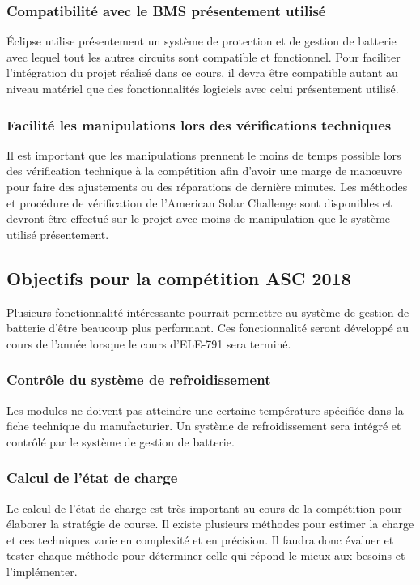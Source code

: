 		\subsubsection{Compatibilité avec le BMS présentement utilisé}
		Éclipse utilise présentement un système de protection et de gestion de batterie avec lequel tout les autres circuits sont compatible et fonctionnel. Pour faciliter l'intégration du projet réalisé dans ce cours, il devra être compatible autant au niveau matériel que des fonctionnalités logiciels avec celui présentement utilisé.		
		
		\subsubsection{Facilité les manipulations lors des vérifications techniques}
		Il est important que les manipulations prennent le moins de temps possible lors des vérification technique à la compétition afin d'avoir une marge de manœuvre pour faire des ajustements ou des réparations de dernière minutes. Les méthodes et procédure de vérification de l'American Solar Challenge sont disponibles et devront être effectué sur le projet avec moins de manipulation que le système utilisé présentement.
		
	\subsection{Objectifs pour la compétition ASC 2018}
	Plusieurs fonctionnalité intéressante pourrait permettre au système de gestion de batterie d'être beaucoup plus performant. Ces fonctionnalité seront développé au cours de l'année lorsque le cours d'ELE-791 sera terminé. 
	
	\subsubsection{Contrôle du système de refroidissement}
	Les modules ne doivent pas atteindre une certaine température spécifiée dans la fiche technique du manufacturier. Un système de refroidissement sera intégré et contrôlé par le système de gestion de batterie. 
	
	\subsubsection{Calcul de l'état de charge}
	Le calcul de l'état de charge est très important au cours de la compétition pour élaborer la stratégie de course. Il existe plusieurs méthodes pour estimer la charge et ces techniques varie en complexité et en précision. Il faudra donc évaluer et tester chaque méthode pour déterminer celle qui répond le mieux aux besoins et l'implémenter. 
	
